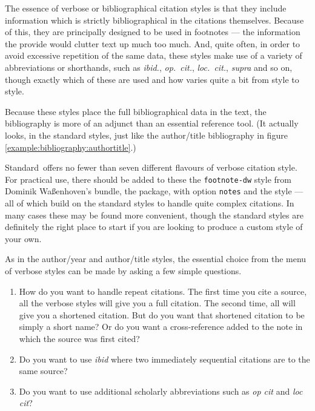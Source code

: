 The essence of verbose or bibliographical citation styles is that they
include information which is strictly bibliographical in the citations
themselves. Because of this, they are principally designed to be used
in footnotes --- the information the provide would clutter text up
much too much. And, quite often, in order to avoid excessive
repetition of the same data, these styles make use of a variety of
abbreviations or shorthands, such as \emph{ibid.}, \emph{op.\ cit.},
\emph{loc.\ cit.}, \emph{supra} and so on, though exactly which of
these are used and how varies quite a bit from style to style.

Because these styles place the full bibliographical data in the text,
the bibliography is more of an adjunct than an essential reference
tool. (It actually looks, in the standard styles, just like the
author/title bibliography in figure
\ref{example:bibliography:authortitle}.)

Standard\biblatex\ offers no fewer than seven different flavours of
verbose citation style. For practical use, there should be added to
these the \verb|footnote-dw| style from Dominik Waßenhoven's
 bundle, the 
package, with option \verb|notes| and the  style ---
all of which build on the standard styles to handle quite complex
citations. In many cases these may be found more convenient, though
the standard styles are definitely the right place to start if you are
looking to produce a custom style of your own.

As in the author/year and author/title styles, the essential choice
from the menu of verbose styles can be made by asking a few simple
questions.
\begin{enumerate}
\item How do you want to handle repeat citations. The first time you
  cite a source, all the verbose styles will give you a full
  citation. The second time, all will give you a shortened
  citation. But do you want that shortened citation to be simply a
  short name? Or do you want a cross-reference added to the note in
  which the source was first cited?
\item Do you want to use \emph{ibid} where two immediately sequential citations
  are to the same source?
\item Do you want to use additional scholarly abbreviations such as
  \emph{op cit} and \emph{loc cit}?
\end{enumerate}

